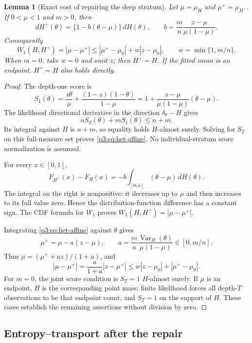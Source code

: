 \documentclass[11pt,a4paper]{article}
\newtheorem{lemma}[theorem]{Lemma}
\theoremstyle{definition}
\theoremstyle{remark}
\numberwithin{equation}{section}
\begin{document}
\begin{lemma}[Exact cost of repairing the deep stratum]
\label{p3:lem:het-affine}
Let $\mu=\mu_H$ and $\mu^+=\mu_{H^+}$.  If $0<\mu<1$ and $m>0$, then
\begin{equation}\label{p3:eq:het-affine}
 dH^+(\theta)=\{1-b(\theta-\mu)\}\,dH(\theta),
 \qquad b=\frac mn\frac{z-\mu}{\mu(1-\mu)}.
\end{equation}
Consequently
\begin{equation}\label{p3:eq:het-repair-cost}
 W_1(H,H^+)=|\mu-\mu^+|
 \le|\mu^+-\mu_0|+w|z-\mu_0|,
 \qquad w=\min\{1,m/n\}.
\end{equation}
When $m=0$, take $w=0$ and omit $z$; then $H^+=H$.  If the fitted mean
is an endpoint, $H^+=H$ also holds directly.
\end{lemma}
\begin{proof}
The depth-one score is
\[
 S_1(\theta)=\frac{z\theta}{\mu}
       +\frac{(1-z)(1-\theta)}{1-\mu}
     =1+\frac{z-\mu}{\mu(1-\mu)}(\theta-\mu).
\]
The likelihood directional derivative in the direction $\delta_\theta-H$
gives
\[
 nS_T(\theta)+mS_1(\theta)\le n+m.
\]
Its integral against $H$ is $n+m$, so equality holds $H$-almost surely.
Solving for $S_T$ on this full-measure set proves
\eqref{p3:eq:het-affine}.  No individual-stratum score normalization is assumed.

For every $x\in[0,1]$,
\[
 F_{H^+}(x)-F_H(x)
      =-b\int_{[0,x]}(\theta-\mu)\,dH(\theta).
\]
The integral on the right is nonpositive: it decreases up to $\mu$ and
then increases to its full value zero.  Hence the distribution-function
difference has a constant sign.  The CDF formula for $W_1$ proves
$W_1(H,H^+)=|\mu-\mu^+|$.

Integrating \eqref{p3:eq:het-affine} against $\theta$ gives
\[
 \mu^+=\mu-a(z-\mu),\qquad
 a=\frac mn\frac{\operatorname{Var}_H(\theta)}{\mu(1-\mu)}
            \in[0,m/n].
\]
Thus $\mu=(\mu^++az)/(1+a)$, and
\[
 |\mu-\mu^+|=\frac a{1+a}|z-\mu^+|
        \le w|z-\mu_0|+|\mu^+-\mu_0|.
\]
For $m=0$, the joint score condition is $S_T=1$ $H$-almost surely.
If $\mu$ is an endpoint, $H$ is the corresponding point mass; finite
likelihood forces all depth-$T$ observations to be that endpoint count,
and $S_T=1$ on the support of $H$.  These cases establish the remaining
assertions without division by zero.
\end{proof}

\subsection{Entropy--transport after the repair}
\end{document}
